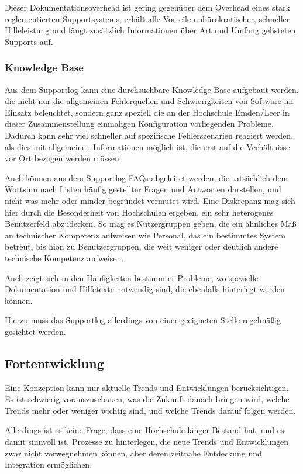 Dieser Dokumentationsoverhead ist gering gegenüber dem Overhead eines stark reglementierten Supportsystems, erhält alle Vorteile unbürokratischer, schneller Hilfeleistung und fängt zusätzlich Informationen über Art und Umfang gelisteten Supports auf.

\subsubsection{Knowledge Base}
Aus dem Supportlog kann eine durchsuchbare Knowledge Base aufgebaut werden, die nicht nur die allgemeinen Fehlerquellen und Schwierigkeiten von Software im Einsatz beleuchtet, sondern ganz speziell die an der Hochschule Emden/Leer in dieser Zusammenstellung einmaligen Konfiguration vorliegenden Probleme.
Dadurch kann sehr viel schneller auf spezifische Fehlerszenarien reagiert werden, als dies mit allgemeinen Informationen möglich ist, die erst auf die Verhältnisse vor Ort bezogen werden müssen.

Auch können aus dem Supportlog FAQs abgeleitet werden, die tatsächlich dem Wortsinn nach Listen häufig gestellter Fragen und Antworten darstellen, und nicht was mehr oder minder begründet vermutet wird. Eine Diskrepanz mag sich hier durch die Besonderheit von Hochschulen ergeben, ein sehr heterogenes Benutzerfeld abzudecken. So mag es Nutzergruppen geben, die ein ähnliches Maß an technischer Kompetenz aufweisen wie Personal, das ein bestimmtes System betreut, bis hion zu Benutzergruppen, die weit weniger oder deutlich andere technische Kompetenz aufweisen.

Auch zeigt sich in den Häufigkeiten bestimmter Probleme, wo spezielle Dokumentation und Hilfetexte notwendig sind, die ebenfalls hinterlegt werden können.

Hierzu muss das Supportlog allerdings von einer geeigneten Stelle regelmäßig gesichtet werden.

\subsection{Fortentwicklung}
Eine Konzeption kann nur aktuelle Trends und Entwicklungen berücksichtigen. Es ist schwierig vorauszuschauen, was die Zukunft danach bringen wird, welche Trends mehr oder weniger wichtig sind, und welche Trends darauf folgen werden.

Allerdings ist es keine Frage, dass eine Hochschule länger Bestand hat, und es damit sinnvoll ist, Prozesse zu hinterlegen, die neue Trends und Entwicklungen zwar nicht vorwegnehmen können, aber deren zeitnahe Entdeckung und Integration ermöglichen.


